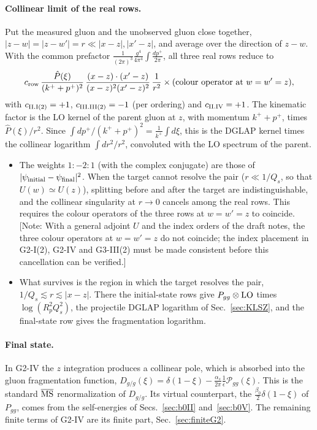 \documentclass[aps,prd,onecolumn,superscriptaddress,nofootinbib,floatfix,longbibliography,11pt]{revtex4-2}
\numberwithin{equation}{section}
\newif\ifshownotes \shownotestrue
\newcommand{\note}[1]{\ifshownotes{\color{red}\,[\textsf{Note:} #1]}\fi}
\newcommand{\Phat}{\hat P}
\newcommand{\MSbar}{\overline{\rm MS}}
\begin{document}
\paragraph*{Collinear limit of the real rows.} Put the measured gluon and the unobserved gluon close together, $|z-w|=|z-w'|=r\ll|x-z|,|x'-z|$, and average over the direction of $z-w$. With the common prefactor $\frac{1}{(2\pi)^3}\frac{g^4}{4\pi^4}\int\frac{dp^+}{2\pi}$, all three real rows reduce to
\begin{equation}
c_{\rm row}\,\frac{\Phat(\xi)}{(k^++p^+)^2}\,\frac{(x-z)\cdot(x'-z)}{(x-z)^2(x'-z)^2}\,\frac{1}{r^2}\times(\text{colour operator at }w=w'=z),
\label{eq:collinear}
\end{equation}
with $c_{\rm II.I(2)}=+1$, $c_{\rm III.III(2)}=-1$ (per ordering) and $c_{\rm II.IV}=+1$. The kinematic factor is the LO kernel of the parent gluon at $z$, with momentum $k^++p^+$, times $\Phat(\xi)/r^2$. Since $\int dp^+/(k^++p^+)^2=\frac{1}{k^+}\int d\xi$, this is the DGLAP kernel times the collinear logarithm $\int dr^2/r^2$, convoluted with the LO spectrum of the parent.
\begin{itemize}
\item The weights $1:-2:1$ (with the complex conjugate) are those of $|\psi_{\rm initial}-\psi_{\rm final}|^2$. When the target cannot resolve the pair ($r\ll1/Q_s$, so that $U(w)\simeq U(z)$), splitting before and after the target are indistinguishable, and the collinear singularity at $r\to0$ cancels among the real rows. This requires the colour operators of the three rows at $w=w'=z$ to coincide.
\note{With a general adjoint $U$ and the index orders of the draft notes, the three colour operators at $w=w'=z$ do not coincide; the index placement in G2-I(2), G2-IV and G3-III(2) must be made consistent before this cancellation can be verified.}
\item What survives is the region in which the target resolves the pair, $1/Q_s\lesssim r\lesssim|x-z|$. There the initial-state rows give $P_{gg}\otimes{\rm LO}$ times $\log(R_p^2Q_s^2)$, the projectile DGLAP logarithm of Sec.~\ref{sec:KLSZ}, and the final-state row gives the fragmentation logarithm.
\end{itemize}

\paragraph*{Final state.} In G2-IV the $z$ integration produces a collinear pole, which is absorbed into the gluon fragmentation function, $D_{g/g}(\xi)=\delta(1-\xi)-\frac{\alpha_s}{2\pi}\frac{1}{\bar\epsilon}\mathcal P_{gg}(\xi)$. This is the standard $\MSbar$ renormalization of $D_{g/g}$. Its virtual counterpart, the $\frac{\beta_0}{2}\delta(1-\xi)$ of $P_{gg}$, comes from the self-energies of Secs.~\ref{sec:b0II} and~\ref{sec:b0V}. The remaining finite terms of G2-IV are its finite part, Sec.~\ref{sec:finiteG2}.
\end{document}
